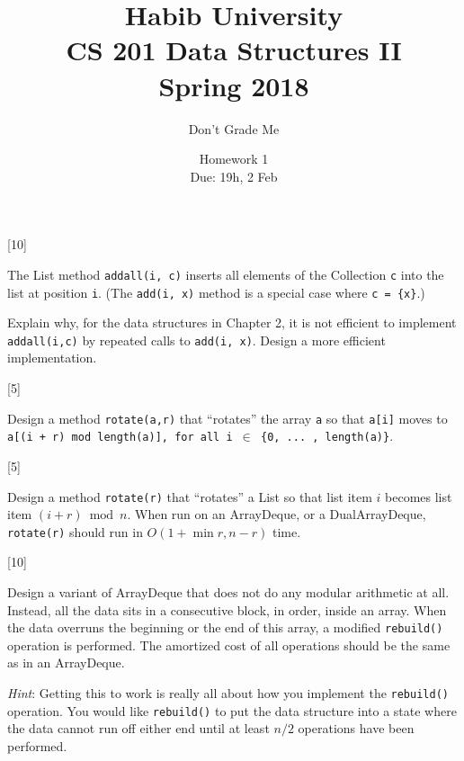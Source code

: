 \documentclass[addpoints]{exam}
\title{Habib University\\CS 201 Data Structures II\\Spring 2018}
\author{Don't Grade Me}  %
\date{Homework 1\\Due: 19h, 2 Feb}
\begin{document}
\maketitle

\begin{questions}

[10]

The List method {\tt add\textunderscore all(i, c)} inserts all elements of the Collection {\tt c} into the list at position {\tt i}. (The {\tt add(i, x)} method is a special case where {\tt c = \{x\}}.)

Explain why, for the data structures in Chapter 2, it is not efficient to implement {\tt add\textunderscore all(i,c)} by repeated calls to {\tt add(i, x)}. Design a more efficient implementation.
\begin{solution}
\end{solution}

[5]

Design a method {\tt rotate(a,r)} that ``rotates'' the array {\tt a} so that {\tt a[i]} moves to {\tt a[(i + r) mod length(a)], for all i $\in$ \{0, ... ,  length(a)\}}.
\begin{solution}
\end{solution}

[5]

Design a method {\tt rotate(r)} that ``rotates'' a List so that list item $i$ becomes list item $(i + r) \bmod n$. When run on an ArrayDeque, or a DualArrayDeque, {\tt rotate(r)} should run in $O(1 + \min{r, n-r})$ time.
\begin{solution}
\end{solution}

[10]

Design a variant of ArrayDeque that does not do any modular arithmetic at all. Instead, all the data sits in a consecutive block, in order, inside an array. When the data overruns the beginning or the end of this array, a modified {\tt rebuild()} operation is performed. The amortized cost of all operations should be the same as in an ArrayDeque.

{\it Hint}: Getting this to work is really all about how you implement the {\tt rebuild()} operation. You would like {\tt rebuild()} to put the data structure into a state where the data cannot run off either end until at least $n/2$ operations have been performed.
\begin{solution}
\end{solution}


\end{questions}
\end{document}
